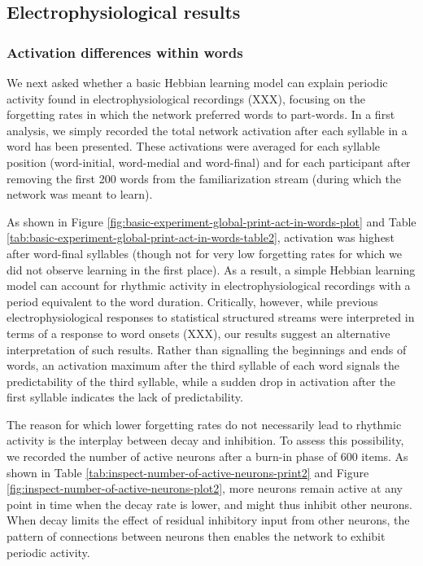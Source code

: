 \documentclass[
]{article}
\begin{document}
\clearpage

\hypertarget{electrophysiological-results}{%
\subsection{Electrophysiological
results}\label{electrophysiological-results}}

\hypertarget{activation-differences-within-words}{%
\subsubsection{Activation differences within
words}\label{activation-differences-within-words}}

We next asked whether a basic Hebbian learning model can explain
periodic activity found in electrophysiological recordings (XXX),
focusing on the forgetting rates in which the network preferred words to
part-words. In a first analysis, we simply recorded the total network
activation after each syllable in a word has been presented. These
activations were averaged for each syllable position (word-initial,
word-medial and word-final) and for each participant after removing the
first 200 words from the familiarization stream (during which the
network was meant to learn).

As shown in Figure
\ref{fig:basic-experiment-global-print-act-in-words-plot} and Table
\ref{tab:basic-experiment-global-print-act-in-words-table2}, activation
was highest after word-final syllables (though not for very low
forgetting rates for which we did not observe learning in the first
place). As a result, a simple Hebbian learning model can account for
rhythmic activity in electrophysiological recordings with a period
equivalent to the word duration. Critically, however, while previous
electrophysiological responses to statistical structured streams were
interpreted in terms of a response to word onsets (XXX), our results
suggest an alternative interpretation of such results. Rather than
signalling the beginnings and ends of words, an activation maximum after
the third syllable of each word signals the predictability of the third
syllable, while a sudden drop in activation after the first syllable
indicates the lack of predictability.

The reason for which lower forgetting rates do not necessarily lead to
rhythmic activity is the interplay between decay and inhibition. To
assess this possibility, we recorded the number of active neurons after
a burn-in phase of 600 items. As shown in Table
\ref{tab:inspect-number-of-active-neurons-print2} and Figure
\ref{fig:inspect-number-of-active-neurons-plot2}, more neurons remain
active at any point in time when the decay rate is lower, and might thus
inhibit other neurons. When decay limits the effect of residual
inhibitory input from other neurons, the pattern of connections between
neurons then enables the network to exhibit periodic activity.
\end{document}
